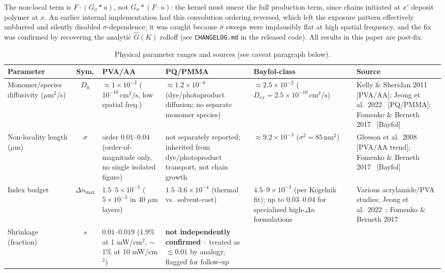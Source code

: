 \documentclass[conference]{IEEEtran}
\begin{document}
The non-local term is $F \cdot (G_\sigma * u)$, not $G_\sigma * (F \cdot u)$:
the kernel must smear the full production term, since chains initiated at
$x'$ deposit polymer at $x$. An earlier internal implementation had this
convolution ordering reversed, which left the exposure pattern effectively
unblurred and silently disabled $\sigma$-dependence; it was caught because
$\sigma$ sweeps were implausibly flat at high spatial frequency, and the fix
was confirmed by recovering the analytic $\hat G(K)$ rolloff (see
\texttt{CHANGELOG.md} in the released code). All results in this paper are
post-fix.

\begin{table}[t]
\centering
\footnotesize
\caption{Physical parameter ranges and sources (see caveat paragraph below).}
\label{tab:params}
\begin{tabular}{@{}p{2.3cm}cp{3.6cm}p{3.6cm}p{3.3cm}p{4.0cm}@{}}
\toprule
Parameter & Sym. & PVA/AA & PQ/PMMA & Bayfol-class & Source \\
\midrule
Monomer/species diffusivity ($\mu\mathrm{m}^2$/s) & $D_0$ &
$\approx 1\times10^{-2}$ ($10^{-10}\,\mathrm{cm^2/s}$, low spatial freq.) &
$\approx 1.2\times10^{-6}$ (dye/photoproduct diffusion; no separate monomer species) &
$\approx 2.5\times10^{-2}$ ($D_{ex}=2.5\times10^{-10}\,\mathrm{cm^2/s}$) &
Kelly \& Sheridan 2011~\cite{kelly2011reply} [PVA/AA]; Jeong et al.\ 2022~\cite{jeong2022pqpmma} [PQ/PMMA]; Fomenko \& Berneth 2017~\cite{fomenko2017bayfol} [Bayfol] \\
Non-locality length ($\mu$m) & $\sigma$ &
order $0.01$--$0.04$ (order-of-magnitude only, no single isolated figure) &
not separately reported; inherited from dye/photoproduct transport, not chain growth &
$\approx 9.2\times10^{-3}$ ($\sigma^2=85\,\mathrm{nm}^2$) &
Gleeson et al.\ 2008~\cite{gleeson2008chain} [PVA/AA trend]; Fomenko \& Berneth 2017~\cite{fomenko2017bayfol} [Bayfol] \\
Index budget & $\Delta n_{\max}$ &
$1.5$--$5\times10^{-3}$ ($5\times10^{-3}$ in 40 $\mu$m layers) &
$1.5$--$3.6\times10^{-4}$ (thermal vs.\ solvent-cast) &
$4.5$--$9\times10^{-3}$ (per Kogelnik fit); up to $0.03$--$0.04$ for specialized high-$\Delta n$ formulations &
Various acrylamide/PVA studies; Jeong et al.\ 2022~\cite{jeong2022pqpmma}; Fomenko \& Berneth 2017~\cite{fomenko2017bayfol} \\
Shrinkage (fraction) & $s$ &
$0.01$--$0.019$ (1.9\% at 1 mW/cm$^2$, $\sim$1\% at 10 mW/cm$^2$) &
\textbf{not independently confirmed} -- treated as $\lesssim 0.01$ by analogy, flagged for follow-up &

\end{tabular}
\end{table}
\end{document}
